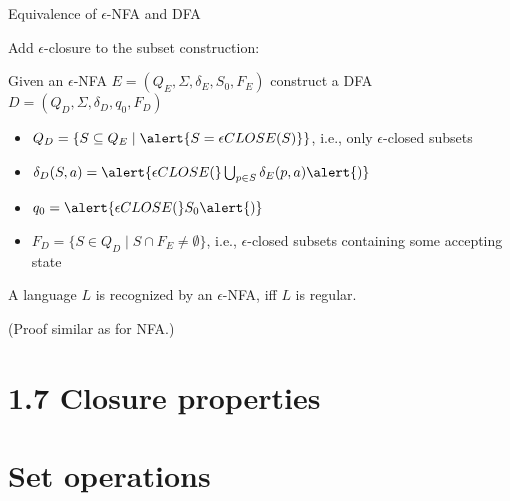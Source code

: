 \documentclass[handout]{beamer}
\begin{document}
\begin{frame}{Equivalence of $\epsilon$-NFA and DFA}

    Add $\epsilon$-closure to the subset construction: 
    
    Given an $\epsilon$-NFA $E=(Q_E,\Sigma,\delta_E,S_0,F_E)$ construct a DFA $D=(Q_D,\Sigma,\delta_D,q_0,F_D)$

    \begin{itemize}
        \item $Q_D=\{S\subseteq Q_E\mid \alert{S=\epsilon CLOSE(S)}\}$, i.e., only \alert{$\epsilon$-closed} subsets
        \item $\delta_D(S,a)=\alert{\epsilon CLOSE(}\bigcup_{p \in S}\delta_E(p,a)\alert{)}$
        \item $q_0=\alert{\epsilon CLOSE(}S_0\alert{)}$
        \item $F_D=\{S\in Q_D \mid S \cap F_E \neq \emptyset\}$, i.e., $\epsilon$-closed subsets containing some accepting state
    \end{itemize}

    \begin{theorem}
        A language $L$ is recognized by an $\epsilon$-NFA, iff $L$ is regular.
    \end{theorem}    
    (Proof similar as for NFA.)

\end{frame}


\section{1.7 Closure properties}


\section{Set operations}
\end{document}
